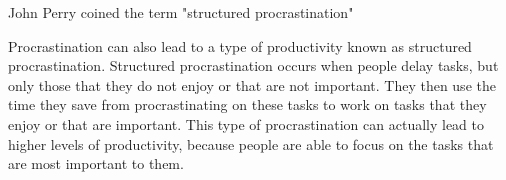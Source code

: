 

John Perry coined the term "structured procrastination"

Procrastination can also lead to a type of productivity known as structured procrastination.
Structured procrastination occurs when people delay tasks,
but only those that they do not enjoy or that are not important.
They then use the time they save from procrastinating on these tasks to work on tasks that they
enjoy or that are important. This type of procrastination can actually lead to higher levels of productivity,
because people are able to focus on the tasks that are most important to them.
